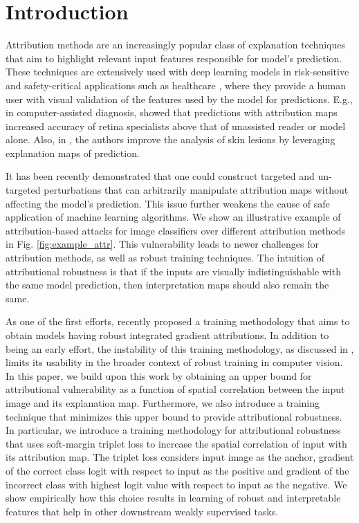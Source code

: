\documentclass[runningheads]{llncs}
\begin{document}
\section{Introduction}
Attribution methods \cite{attr2017grad++,attr2016gradcam,attr2018smoothgrad,attr2013gradient,attr2016inputgradient,attr2017integrated,attr2017deeplift} are an increasingly popular class of explanation techniques that aim to highlight relevant input features responsible for model's prediction. These techniques are extensively used with deep learning models in risk-sensitive and safety-critical applications such as healthcare  \cite{lung,anaemia,eye,skin}, where they provide a human user with visual validation of the features used by the model for predictions. E.g., in computer-assisted diagnosis, \cite{eye} showed that predictions with attribution maps increased accuracy of retina specialists above that of unassisted reader or model alone. Also, in \cite{skin}, the authors improve the analysis of skin lesions by leveraging explanation maps of prediction. 

It has been recently demonstrated that one could construct targeted \cite{nips_sal} and un-targeted perturbations \cite{aaai_sal,robust_attr_nips_sal} that can arbitrarily manipulate attribution maps without affecting the model's prediction. This issue further weakens the cause of safe application of machine learning algorithms. We show an illustrative example of attribution-based attacks for image classifiers over different attribution methods in Fig. \ref{fig:example_attr}. This vulnerability leads to newer challenges for attribution methods, as well as robust training techniques. The intuition of attributional robustness is that if the inputs are visually indistinguishable with the same model prediction, then interpretation maps should also remain the same. 

As one of the first efforts, \cite{robust_attr_nips_sal} recently proposed a training methodology that aims to obtain models having robust integrated gradient \cite{attr2017integrated} attributions. In addition to being an early effort, the instability
of this training methodology, as discussed in \cite{robust_attr_nips_sal}, limits its usability in the broader context of robust training in computer vision. In this paper, we build upon this work by obtaining an upper bound for attributional vulnerability as a function of spatial correlation between the input image and its explanation map. Furthermore, we also introduce a training technique that minimizes this upper bound to provide attributional robustness. In particular, we introduce a training methodology for attributional robustness that uses soft-margin triplet loss to increase the spatial correlation of input with its attribution map. The triplet loss considers input image as the anchor, gradient of the correct class logit with respect to input as the positive and gradient of the incorrect class with highest logit value with respect to input as the negative. We show empirically how this choice results in learning of robust and interpretable features that help in other downstream weakly supervised tasks.
\end{document}
